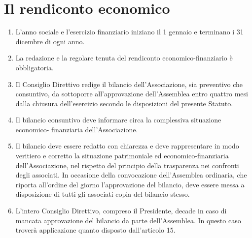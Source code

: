 \documentclass{djtsdoc}
\begin{document}
	\section{Il rendiconto economico}
	\begin{enumerate}
		\item L'anno sociale e l'esercizio finanziario iniziano il 1 gennaio e terminano i 31 dicembre di ogni anno.
		\item La redazione e la regolare tenuta del rendiconto economico-finanziario è obbligatoria.
		\item Il Consiglio Direttivo redige il bilancio dell'Associazione, sia preventivo che consuntivo, da sottoporre all'approvazione dell'Assemblea entro quattro mesi dalla chiusura dell'esercizio secondo le disposizioni del presente Statuto.
		\item Il bilancio consuntivo deve informare circa la complessiva situazione economico- finanziaria dell'Associazione.
		\item Il bilancio deve essere redatto con chiarezza e deve rappresentare in modo veritiero e corretto la situazione patrimoniale ed economico-finanziaria dell'Associazione, nel rispetto del principio della trasparenza nei confronti degli associati. In occasione della convocazione dell'Assemblea ordinaria, che riporta all'ordine del giorno l'approvazione del bilancio, deve essere messa a disposizione di tutti gli associati copia del bilancio stesso.
		\item L'intero Consiglio Direttivo, compreso il Presidente, decade in caso di mancata approvazione del bilancio da parte dell'Assemblea. In questo caso troverà applicazione quanto disposto dall'articolo 15.
	\end{enumerate}
	
\end{document}
